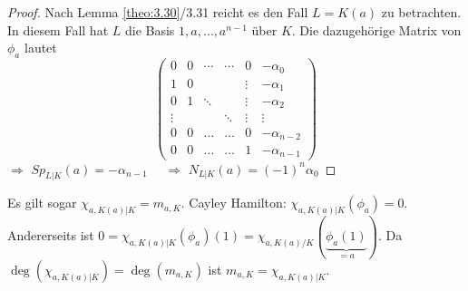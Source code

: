 \documentclass[../main.tex]{subfiles}
\begin{document}
\begin{proof}
    Nach Lemma \ref{theo:3.30}/3.31 reicht es den Fall $L=K(a)$ zu betrachten.
    In diesem Fall hat $L$ die Basis $1,a,\dots,a^{n-1}$ über $K$.
    Die dazugehörige Matrix von $\phi_a$ lautet
    $$\begin{pmatrix}
        0& 0 &\cdots &\cdots & 0 & -\alpha_0\\
        1& 0 & &  & \vdots& -\alpha_1\\
        0& 1 & \ddots && \vdots&-\alpha_2\\
        \vdots&&  &\ddots&\vdots&\vdots\\
        0&0& \dots& \dots &0& -\alpha_{n-2}\\
        0&0&\dots & \dots& 1   &    -\alpha_{n-1}
    \end{pmatrix}$$
    $\Rightarrow$ $Sp_{L|K}(a) = -\alpha_{n-1}\quad$%
    $\Rightarrow$ $N_{L|K} (a) = (-1)^n \alpha_0$
\end{proof}
\begin{remark}
    Es gilt sogar $\chi_{a,K(a)|K} = m_{a,K}$.
    Cayley Hamilton:
    $\chi_{a,K(a)|K}(\phi_a) = 0$.
    Andererseits ist $0=\chi_{a,K(a)|K}(\phi_a)(1) = \chi_{a,K(a)/K}(\underbrace{\phi_a(1)}_{=a}) $. Da $\deg(\chi_{a,K(a)|K})=\deg(m_{a,K})$ ist $m_{a,K} = \chi_{a,K(a)|K}$.
\end{remark}
\end{document}
